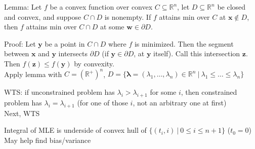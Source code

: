 \documentclass{article}
\begin{document}
Lemma: Let $f$ be a convex function over convex $C \subseteq \mathbb{R}^n$,
let $D \subseteq \mathbb{R}^n$ be closed and convex, and suppose $C \cap D$ is nonempty.
If $f$ attains min over $C$ at $\mathbf{x} \not\in D$, then
$f$ attains min over $C \cap D$ at some $\mathbf{w} \in \partial D$.

Proof: Let $\mathbf{y}$ be a point in $C \cap D$ where $f$ is minimized.
Then the segment between $\mathbf{x}$ and $\mathbf{y}$ intersects $\partial D$
(if $\mathbf{y} \in \partial D$, at $\mathbf{y}$ itself).
Call this intersection $\mathbf{z}$.
Then $f(\mathbf{z}) \leq f(\mathbf{y})$ by convexity. \\

Apply lemma with $C = (\mathbb{R}^+)^n$, $D = \{\boldsymbol{\lambda} = (\lambda_1, \ldots, \lambda_n) \in \mathbb{R}^n\ |\ \lambda_1 \leq \ldots \leq \lambda_n\}$

WTS: if unconstrained problem has $\lambda_i > \lambda_{i+1}$ for some $i$,
then constrained problem has $\lambda_i = \lambda_{i+1}$
(for one of those $i$, not an arbitrary one at first) \\
Next, WTS 


\newpage
Integral of MLE is underside of convex hull of $\{(t_i, i)\ |\ 0 \leq i \leq n+1\}$ ($t_0 = 0$) \\
May help find bias/variance
\end{document}

